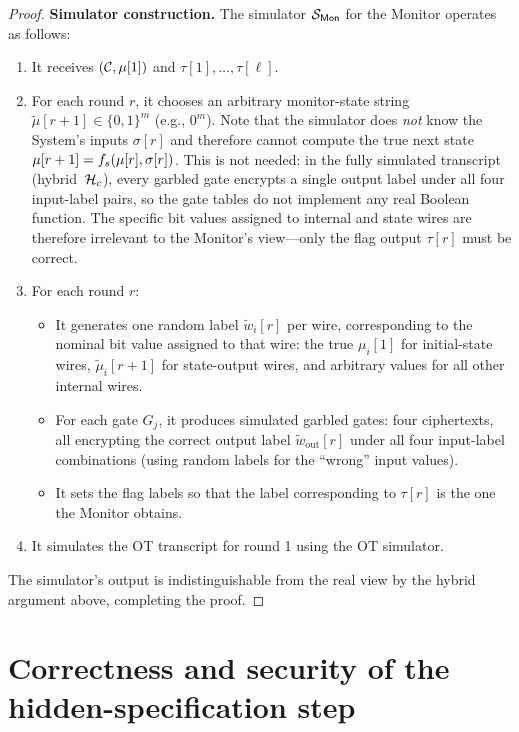 \begin{proof}
\medskip
\noindent\textbf{Simulator construction.}
The simulator $\mathcal{S}_{\textsf{Mon}}$ for the Monitor operates as follows:
\begin{enumerate}
    \item It receives $(\mathcal{C}, \mu[1])$ and $\tau[1], \ldots, \tau[\ell]$.
    \item For each round $r$, it chooses an arbitrary monitor-state string $\tilde{\mu}[r+1] \in \{0,1\}^m$ (e.g., $0^m$). Note that the simulator does \emph{not} know the System's inputs $\sigma[r]$ and therefore cannot compute the true next state $\mu[r+1] = f_s(\mu[r], \sigma[r])$. This is not needed: in the fully simulated transcript (hybrid~$\mathcal{H}_c$), every garbled gate encrypts a single output label under all four input-label pairs, so the gate tables do not implement any real Boolean function. The specific bit values assigned to internal and state wires are therefore irrelevant to the Monitor's view---only the flag output $\tau[r]$ must be correct.
    \item For each round $r$:
    \begin{itemize}
        \item It generates one random label $\tilde{w}_i[r]$ per wire, corresponding to the nominal bit value assigned to that wire: the true $\mu_i[1]$ for initial-state wires, $\tilde{\mu}_i[r+1]$ for state-output wires, and arbitrary values for all other internal wires.
        \item For each gate $G_j$, it produces simulated garbled gates: four ciphertexts, all encrypting the correct output label $\tilde{w}_{\text{out}}[r]$ under all four input-label combinations (using random labels for the ``wrong'' input values).
        \item It sets the flag labels so that the label corresponding to $\tau[r]$ is the one the Monitor obtains.
    \end{itemize}
    \item It simulates the OT transcript for round 1 using the OT simulator.
\end{enumerate}

The simulator's output is indistinguishable from the real view by the hybrid argument above, completing the proof.
\end{proof}

\section{Correctness and security of the hidden-specification step}\label{sec:proof2}

